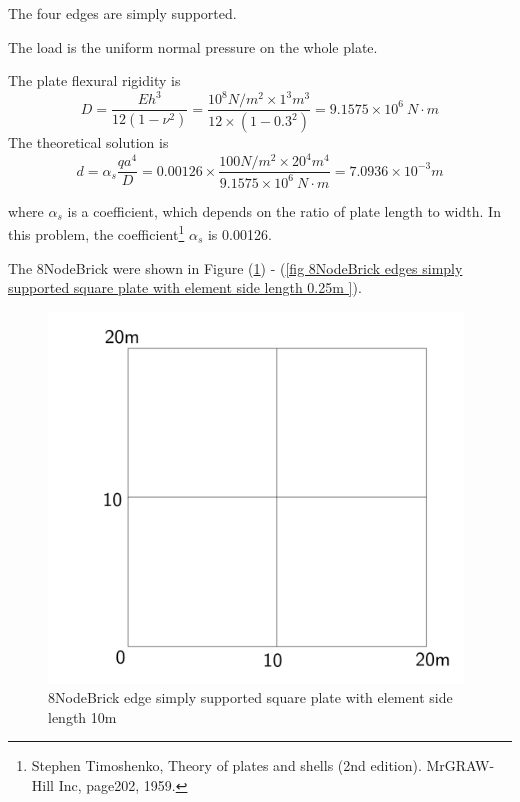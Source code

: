 \documentclass[fleqn,11pt]{article}
\begin{document}
The four edges are simply supported. 

The load is the uniform normal pressure on the whole plate. 

The plate flexural rigidity is 
\begin{equation}
  D=\frac{Eh^3}{12(1-\nu^2)}=\frac{10^8 N/m^2 \times 1^3 m^3 }{12 \times (1-0.3^2) }= 9.1575 \times 10^6 \ N\cdot m
\end{equation}
The theoretical solution is 
\begin{equation}
  d=\alpha_s \frac{q a^4}{D}=0.00126\times \frac{100 N/m^2 \times 20^4 m^4}{9.1575 \times 10^6 \ N\cdot m}=7.0936\times 10^{-3} m
\end{equation}

where $\alpha_s$ is a coefficient, which depends on the ratio of plate length to width. In this problem, the coefficient\footnote{Stephen Timoshenko, Theory of plates and shells (2nd edition). MrGRAW-Hill Inc, page202, 1959.} $\alpha_s$ is 0.00126.


The 8NodeBrick were shown in Figure (\ref{fig 8NodeBrick edges simply supported square plate with element side length 10m }) - (\ref{fig 8NodeBrick edges simply supported square plate with element side length 0.25m }). 



\begin{figure}[H]
  \centering
  \includegraphics[width=11cm]{../Figure-files/square_plate1.pdf}
  \caption{8NodeBrick edge simply supported square plate with element side length 10m }
  \label{fig 8NodeBrick edges simply supported square plate with element side length 10m }
\end{figure}
\end{document}

